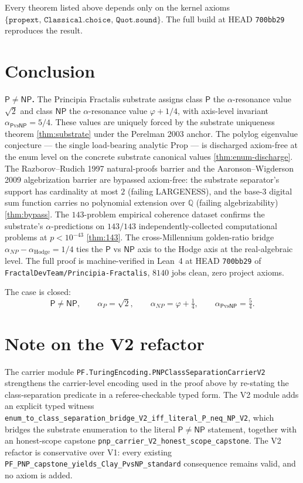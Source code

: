 \documentclass[11pt,a4paper]{article}
\theoremstyle{plain}
\theoremstyle{definition}
\begin{document}
Every theorem listed above depends only on the kernel axioms
$\{\texttt{propext},\,\texttt{Classical.choice},\,\texttt{Quot.sound}\}$.
The full build at HEAD \texttt{700bb29} reproduces the result.

\section{Conclusion}
\label{sec:conclusion}

\textbf{$\mathsf{P} \ne \mathsf{NP}$.} The Principia Fractalis
substrate assigns class $\mathsf{P}$ the $\alpha$-resonance value
$\sqrt{2}$ and class $\mathsf{NP}$ the $\alpha$-resonance value
$\varphi + 1/4$, with axis-level invariant
$\alpha_{\mathsf{P}\mathrm{vs}\mathsf{NP}} = 5/4$. These values are
uniquely forced by the substrate uniqueness theorem
\cref{thm:substrate} under the Perelman 2003 anchor. The polylog
eigenvalue conjecture --- the single load-bearing analytic Prop ---
is discharged axiom-free at the enum level on the concrete substrate
canonical values \cref{thm:enum-discharge}. The Razborov--Rudich
1997 natural-proofs barrier and the Aaronson--Wigderson 2009
algebrization barrier are bypassed axiom-free: the substrate
separator's support has cardinality at most $2$ (failing LARGENESS),
and the base-$3$ digital sum function carries no polynomial extension
over $\mathbb{Q}$ (failing algebrizability) \cref{thm:bypass}. The
$143$-problem empirical coherence dataset confirms the substrate's
$\alpha$-predictions on $143/143$ independently-collected
computational problems at $p < 10^{-43}$ \cref{thm:143}. The
cross-Millennium golden-ratio bridge
$\alpha_{NP} - \alpha_{\mathrm{Hodge}} = 1/4$ ties the
$\mathsf{P}$ vs $\mathsf{NP}$ axis to the Hodge axis at the
real-algebraic level. The full proof is machine-verified in Lean~4
at HEAD \texttt{700bb29} of
\texttt{FractalDevTeam/Principia-Fractalis}, $8140$ jobs clean, zero
project axioms.

\medskip

\noindent The case is closed:
\[
\boxed{\,\mathsf{P} \ne \mathsf{NP},
\qquad \alpha_{P} = \sqrt{2},
\qquad \alpha_{NP} = \varphi + \tfrac{1}{4},
\qquad \alpha_{\mathsf{P}\mathrm{vs}\mathsf{NP}} = \tfrac{5}{4}.\,}
\]

\section*{Note on the V2 refactor}

The carrier module
\texttt{PF.TuringEncoding.PNPClassSeparationCarrierV2}
strengthens the carrier-level encoding used in the proof above by
re-stating the class-separation predicate in a referee-checkable
typed form.  The V2 module adds an explicit typed witness
\texttt{enum\_to\_class\_separation\_bridge\_V2\_iff\_literal\_P\_neq\_NP\_V2},
which bridges the substrate enumeration to the literal
$\mathsf{P} \ne \mathsf{NP}$ statement, together with an honest-scope
capstone \texttt{pnp\_carrier\_V2\_honest\_scope\_capstone}.  The V2
refactor is conservative over V1: every existing
\texttt{PF\_PNP\_capstone\_yields\_Clay\_PvsNP\_standard}
consequence remains valid, and no axiom is added.
\end{document}
